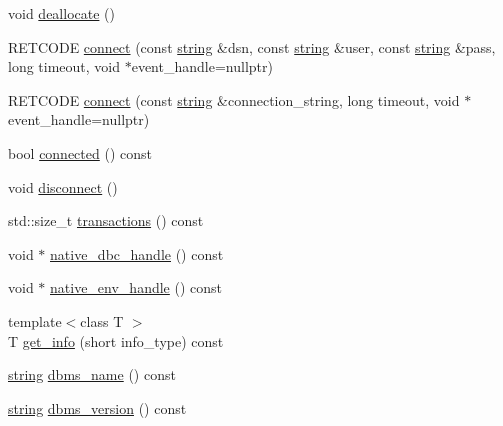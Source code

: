 \begin{DoxyCompactItemize}
\item 
void \mbox{\hyperlink{classnanodbc_1_1connection_1_1connection__impl_a5b1ade50d637ba3c7b99c35cd07a73c5}{deallocate}} ()
\item 
R\+E\+T\+C\+O\+DE \mbox{\hyperlink{classnanodbc_1_1connection_1_1connection__impl_a6ed45f56511103a8ecd44c86f9da7460}{connect}} (const \mbox{\hyperlink{namespacenanodbc_abfc0ece56278e590911ec8352774c212}{string}} \&dsn, const \mbox{\hyperlink{namespacenanodbc_abfc0ece56278e590911ec8352774c212}{string}} \&user, const \mbox{\hyperlink{namespacenanodbc_abfc0ece56278e590911ec8352774c212}{string}} \&pass, long timeout, void $\ast$event\+\_\+handle=nullptr)
\item 
R\+E\+T\+C\+O\+DE \mbox{\hyperlink{classnanodbc_1_1connection_1_1connection__impl_a424e8e3320aa5d89327509b10827b94c}{connect}} (const \mbox{\hyperlink{namespacenanodbc_abfc0ece56278e590911ec8352774c212}{string}} \&connection\+\_\+string, long timeout, void $\ast$event\+\_\+handle=nullptr)
\item 
bool \mbox{\hyperlink{classnanodbc_1_1connection_1_1connection__impl_a07e1296c6fef6975a2e18960d7c4eaf8}{connected}} () const
\item 
void \mbox{\hyperlink{classnanodbc_1_1connection_1_1connection__impl_a0a79ee37a932f7b8e4ad42d25382f593}{disconnect}} ()
\item 
std\+::size\+\_\+t \mbox{\hyperlink{classnanodbc_1_1connection_1_1connection__impl_a13d80445241c6d01e8bbb631d685b54b}{transactions}} () const
\item 
void $\ast$ \mbox{\hyperlink{classnanodbc_1_1connection_1_1connection__impl_ab2ef63866e11891ee6909c9b73cfc897}{native\+\_\+dbc\+\_\+handle}} () const
\item 
void $\ast$ \mbox{\hyperlink{classnanodbc_1_1connection_1_1connection__impl_a46755c1b7518a0abc96d023e2b5a0811}{native\+\_\+env\+\_\+handle}} () const
\item 
{\footnotesize template$<$class T $>$ }\\T \mbox{\hyperlink{classnanodbc_1_1connection_1_1connection__impl_afd634ba8f94e93c9124d0239f2566795}{get\+\_\+info}} (short info\+\_\+type) const
\item 
\mbox{\hyperlink{namespacenanodbc_abfc0ece56278e590911ec8352774c212}{string}} \mbox{\hyperlink{classnanodbc_1_1connection_1_1connection__impl_acdc38f72d5c02e68f12ec1ff0974b04f}{dbms\+\_\+name}} () const
\item 
\mbox{\hyperlink{namespacenanodbc_abfc0ece56278e590911ec8352774c212}{string}} \mbox{\hyperlink{classnanodbc_1_1connection_1_1connection__impl_a2688984011af8e756d8903bddbf318e7}{dbms\+\_\+version}} () const

\end{DoxyCompactItemize}
